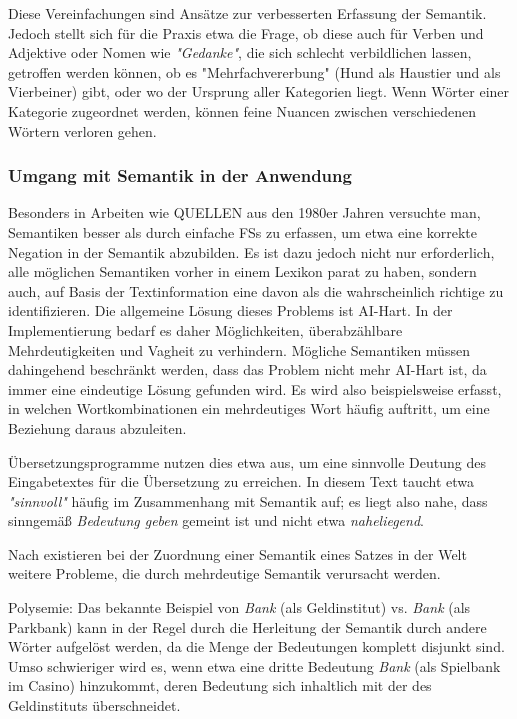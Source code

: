 \documentclass[12pt]{paper}
\begin{document}
Diese Vereinfachungen sind Ansätze zur verbesserten Erfassung der Semantik. Jedoch stellt sich für die Praxis etwa die Frage, ob diese auch für Verben und Adjektive oder Nomen wie \textit{"Gedanke"}, die sich schlecht verbildlichen lassen, getroffen werden können, ob es "Mehrfachvererbung" (Hund als Haustier und als Vierbeiner) gibt, oder wo der Ursprung aller Kategorien liegt. Wenn Wörter einer Kategorie zugeordnet werden, können feine Nuancen zwischen verschiedenen Wörtern verloren gehen.

\subsubsection{Umgang mit Semantik in der Anwendung}
Besonders in Arbeiten wie QUELLEN aus den 1980er Jahren versuchte man, Semantiken besser als durch einfache FSs zu erfassen, um etwa eine korrekte Negation in der Semantik abzubilden. Es ist dazu jedoch nicht nur erforderlich, alle möglichen Semantiken vorher in einem Lexikon parat zu haben, sondern auch, auf Basis der Textinformation eine davon als die wahrscheinlich richtige zu identifizieren. Die allgemeine Lösung dieses Problems ist AI-Hart. In der Implementierung bedarf es daher Möglichkeiten, überabzählbare Mehrdeutigkeiten und Vagheit zu verhindern. Mögliche Semantiken müssen dahingehend beschränkt werden, dass das Problem nicht mehr AI-Hart ist, da immer eine eindeutige Lösung gefunden wird. Es wird also beispielsweise erfasst, in welchen Wortkombinationen ein mehrdeutiges Wort häufig auftritt, um eine Beziehung daraus abzuleiten. 

Übersetzungsprogramme nutzen dies etwa aus, um eine sinnvolle Deutung des Eingabetextes für die Übersetzung zu erreichen. In diesem Text taucht etwa \textit{"sinnvoll"} häufig im Zusammenhang mit Semantik auf; es liegt also nahe, dass sinngemäß \textit{Bedeutung geben} gemeint ist und nicht etwa \textit{naheliegend}. 

Nach \cite{car52} existieren bei der Zuordnung einer Semantik eines Satzes in der Welt weitere Probleme, die durch mehrdeutige Semantik verursacht werden.

Polysemie: Das bekannte Beispiel von \textit{Bank} (als Geldinstitut) vs. \textit{Bank} (als Parkbank) kann in der Regel durch die Herleitung der Semantik durch andere Wörter aufgelöst werden, da die Menge der Bedeutungen komplett disjunkt sind. Umso schwieriger wird es, wenn etwa eine dritte Bedeutung \textit{Bank} (als Spielbank im Casino) hinzukommt, deren Bedeutung sich inhaltlich mit der des Geldinstituts überschneidet. 
\end{document}
